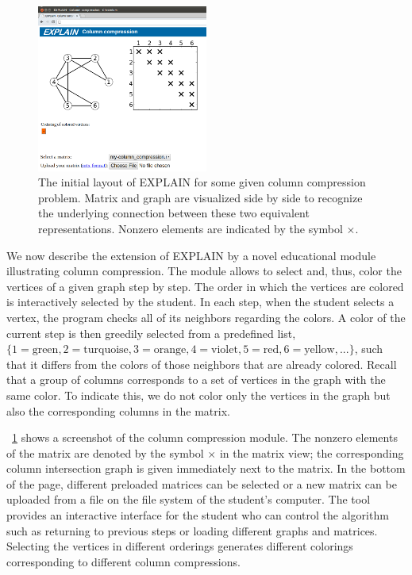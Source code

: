 \documentclass[12pt, oneside]{book}
\begin{document}
\begin{figure}
\centering
\includegraphics[width=0.5\textwidth]{fig1.png}
\caption{The initial layout of EXPLAIN for some given column compression problem. Matrix and graph are visualized side by side to recognize the underlying connection between these two equivalent representations. Nonzero elements are indicated by the symbol $\times$.
}
\label{fig1}
\end{figure}
We now describe the extension of \mbox{EXPLAIN} by a novel educational module illustrating column compression. The module allows to select and, thus, color the vertices of a given graph step by step. The order in which the vertices are colored is interactively selected by the student. In each step, when the student selects a vertex, the program checks all of its neighbors regarding the colors. A color of the current step is then greedily selected from a predefined list, $\{1=\text{green}, 2=\text{turquoise}, 3=\text{orange}, 4=\text{violet}, 5=\text{red}, 6=\text{yellow}, ...\}$, such that it differs from the colors of those neighbors that are already colored. Recall that a group of columns corresponds to a set of vertices in the graph with the same color. To indicate this, we do not color only the vertices in the graph but also the corresponding columns in the matrix.

\figurename~\ref{fig1} shows a screenshot of the column compression module. The nonzero elements of the matrix are denoted by the symbol $\times$ in the matrix view; the corresponding column intersection graph is given immediately next to the matrix. In the bottom of the page, different preloaded matrices can be selected or a new matrix can be uploaded from a file on the file system of the student's computer. The tool provides an interactive interface for the student who can control the algorithm such as returning to previous steps or loading different graphs and matrices. Selecting the vertices in different orderings generates different colorings corresponding to different column compressions.
\end{document}
